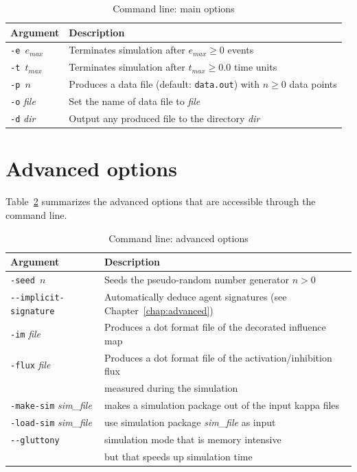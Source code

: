 \documentclass[11pt]{book}
\def\ttt#1{\texttt{#1}}
\def\mit#1{{\mathit #1}}
\def\dd{-\hspace{0.001cm}-}
\begin{document}
\begin{table}[htdp]
\caption{Command line: main options}
\begin{center}
\begin{tabular}{|l|l|}
\hline 
Argument & Description \\ \hline
\ttt{-e $e_\mit{max}$} & Terminates simulation after $e_\mit{max}\geq 0$ events\\
\ttt{-t $t_\mit{max}$} & Terminates simulation after $t_\mit{max}\geq 0.0$ time units\\
\ttt{-p $n$} & Produces a data file\index{data file} (default: \ttt{data.out}) with $n\geq 0$ data points\\
\ttt{-o} \textit{file} & Set the name of data file to \textit{file}\\ 
\ttt{-d} \textit{dir} & Output any produced file to the directory \textit{dir}\\
\hline
\end{tabular}
\end{center}
\label{tab:options}
\end{table}%

\section{Advanced options}

Table~\ref{tab:add-options} summarizes the advanced options that are accessible through the command line.

\begin{table}[htdp]
\caption{Command line: advanced options}
\begin{center}
\begin{tabular}{|l|l|}
\hline 
Argument & Description \\ \hline
\ttt{\small -seed $n$} &\small Seeds the pseudo-random number generator $n>0$ \\
\ttt{\small \dd implicit-signature} &\small Automatically deduce agent signatures (see Chapter~\ref{chap:advanced})\\
\ttt{\small -im} \textit{file} &\small Produces a dot format file of the decorated influence map \\
\ttt{\small -flux} \textit{file} &\small Produces a dot format file of the activation/inhibition flux \\ & measured during the simulation \\
\ttt{\small -make-sim} \textit{sim\_file} &\small makes a simulation package out of the input kappa files \\
\ttt{\small -load-sim} \textit{sim\_file} &\small use simulation package \textit{sim\_file} as input\\
\ttt{\small \dd gluttony} &\small simulation mode that is memory intensive \\ &\small but that speeds up simulation time\\

\hline
\end{tabular}
\end{center}
\label{tab:add-options}
\end{table}%
%
\end{document}

